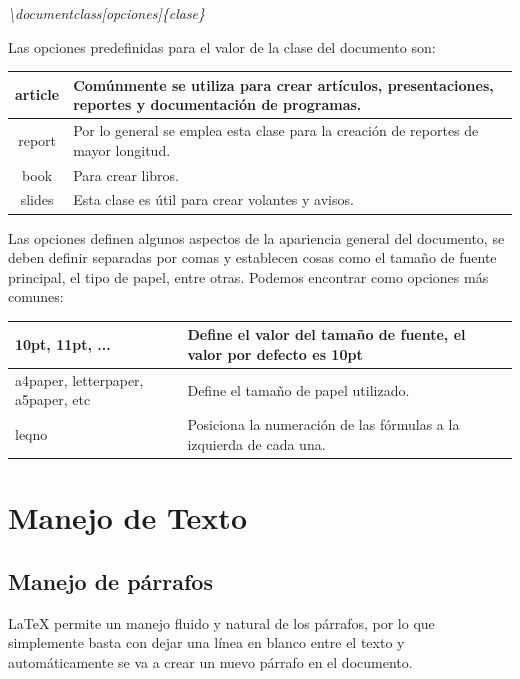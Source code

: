 \documentclass[journal]{IEEEtran}
\begin{document}
\begin{center}
  \emph{\textbackslash{}documentclass[opciones]\{clase\}}
\end{center}


Las opciones predefinidas para el valor de la clase del documento son:

\begin{tabular}[t]{|c|p{5cm}|}
  \hline
  article & Comúnmente se utiliza para crear artículos, presentaciones, reportes y documentación de programas. \\ \hline
  report & Por lo general se emplea esta clase para la creación de reportes de mayor longitud. \\ \hline
  book & Para crear libros. \\ \hline
  slides & Esta clase es útil para crear volantes y avisos. \\ \hline
\end{tabular}

\hfill \break
Las opciones definen algunos aspectos de la apariencia general del documento, se deben
definir separadas por comas y establecen cosas como el tamaño de fuente principal, el tipo de papel, entre otras.
Podemos encontrar como opciones más comunes:
\begin{center}
  \begin{tabular}[t]{|m{2cm}|m{3cm}|}
    \hline
    10pt, 11pt, ... & Define el valor del tamaño de fuente, el valor por defecto es 10pt \\ \hline
    a4paper, letterpaper, a5paper, etc & Define el tamaño de papel utilizado. \\ \hline
    leqno & Posiciona la numeración de las fórmulas a la izquierda de cada una. \\ \hline
  \end{tabular}  
\end{center}




\section{Manejo de Texto}
\subsection{Manejo de párrafos}
\LaTeX\xspace  permite un manejo fluido y natural de los párrafos, por lo que simplemente basta con dejar una línea en blanco entre el texto y automáticamente se va a crear un nuevo párrafo en el documento.
\end{document}
